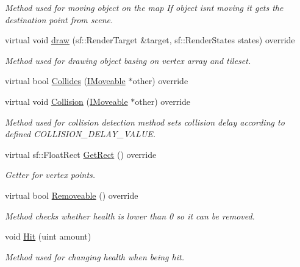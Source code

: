 \begin{DoxyCompactItemize}
\begin{DoxyCompactList}\small\item\em Method used for moving object on the map If object isn\textquotesingle{}t moving it gets the destination point from scene. \end{DoxyCompactList}\item 
virtual void \mbox{\hyperlink{class_enemy_designer_ab496f15186e05c356bbdb7931fed56b6}{draw}} (sf\+::\+Render\+Target \&target, sf\+::\+Render\+States states) override
\begin{DoxyCompactList}\small\item\em Method used for drawing object basing on vertex array and tileset. \end{DoxyCompactList}\item 
virtual bool \mbox{\hyperlink{class_enemy_designer_aaea93aae4a87f999f2f11233aca161c1}{Collides}} (\mbox{\hyperlink{class_i_moveable}{I\+Moveable}} $\ast$other) override
\item 
virtual void \mbox{\hyperlink{class_enemy_designer_a2d9fb6cc11f8f975b263d6739a1a3ac2}{Collision}} (\mbox{\hyperlink{class_i_moveable}{I\+Moveable}} $\ast$other) override
\begin{DoxyCompactList}\small\item\em Method used for collision detection method sets collision delay according to defined C\+O\+L\+L\+I\+S\+I\+O\+N\+\_\+\+D\+E\+L\+A\+Y\+\_\+\+V\+A\+L\+UE. \end{DoxyCompactList}\item 
virtual sf\+::\+Float\+Rect \mbox{\hyperlink{class_enemy_designer_a1dc87f5766601115601c20de865ef6d7}{Get\+Rect}} () override
\begin{DoxyCompactList}\small\item\em Getter for vertex points. \end{DoxyCompactList}\item 
virtual bool \mbox{\hyperlink{class_enemy_designer_a721c45f9d14c10f55b2d7ae624e2db6a}{Removeable}} () override
\begin{DoxyCompactList}\small\item\em Method checks whether health is lower than 0 so it can be removed. \end{DoxyCompactList}\item 
void \mbox{\hyperlink{class_enemy_designer_a6aac3b8c8fa145212a1d37a1f1bcaca7}{Hit}} (uint amount)
\begin{DoxyCompactList}\small\item\em Method used for changing health when being hit. \end{DoxyCompactList}\item 

\end{DoxyCompactItemize}
